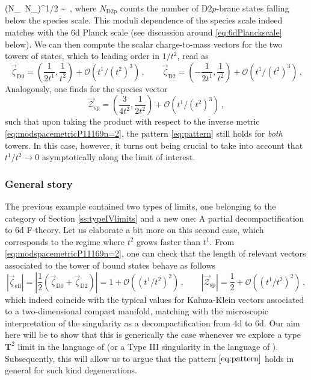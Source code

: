 %
\beq 
	 \simeq \left(N_{}\, N_{}\right)^{1/2} \sim {}\, ,
\eeq
%
where $N_{\text{D2p}}$ counts the number of D$2p$-brane states falling below the species scale. This moduli dependence of the species scale indeed matches with the 6d Planck scale (see discussion around \eqref{eq:6dPlanckscale} below). We can then compute the scalar charge-to-mass vectors for the two towers of states, which to leading order in $1/t^2$, read as
%
\begin{equation}\label{eq:zetavectorsD0D2n=2}
	\vec{\zeta}_{\text{D0}} = \left( \frac{1}{2 t^1}, \frac{1}{t^2} \right) + \mathcal{O}\left(t^1/(t^2)^3\right)\, , \qquad \vec{\zeta}_{\text{D2}} = \left( -\frac{1}{2 t^1}, \frac{1}{t^2} \right) + \mathcal{O}\left(t^1/(t^2)^3\right)\, .
\end{equation}
%
Analogously, one finds for the species vector
%
\begin{equation}\label{eq:speciesvectorIIA}
	\vec{\mathcal{Z}}_{\text{sp}} = \left( \frac{3}{4 t^2}, \frac{1}{2t^2} \right) + \mathcal{O}\left(t^1/(t^2)^3\right)\, ,
\end{equation}
%
such that upon taking the product with respect to the inverse metric \eqref{eq:modspacemetricP11169n=2}, the pattern \eqref{eq:pattern} still holds for \emph{both} towers. In this case, however, it turns out being crucial to take into account that $t^1/t^2 \to 0$ asymptotically along the limit of interest. 
	
	
\subsubsection{General story}
\label{sss:IIA/Fthy}
	
The previous example contained two types of limits, one belonging to the category of Section \ref{ss:typeIVlimits} and a new one: A partial decompactification to 6d F-theory. Let us elaborate a bit more on this second case, which corresponds to the regime where $t^2$ grows faster than $t^1$. From \eqref{eq:modspacemetricP11169n=2}, one can check that the length of relevant vectors associated to the tower of bound states behave as follows
%
\begin{equation}
	|\vec{\zeta}_{\text{eff}}|= \left|\frac{1}{2} (\vec{\zeta}_{\text{D0}} + \vec{\zeta}_{\text{D2}}) \right|= 1 + \mathcal{O}\left( \left(t^1/t^2\right)^2\right)\, , \qquad
	|\vec{\mathcal{Z}}_{\text{sp}}| = \frac{1}{2} + \mathcal{O}\left( \left(t^1/t^2\right)^2\right)\, ,
\end{equation}
%
which indeed coincide with the typical values for Kaluza-Klein vectors associated to a two-dimensional compact manifold, matching with the microscopic interpretation of the singularity as a decompactification from 4d to 6d. Our aim here will be to show that this is generically the case whenever we explore a type $\mathbf{T}^2$ limit in the language of \cite{Lee:2019wij} (or a Type III singularity in the language of \cite{Grimm:2018ohb}). Subsequently, this will allow us to argue that the pattern $\eqref{eq:pattern}$ holds in general for such kind degenerations. 
	
